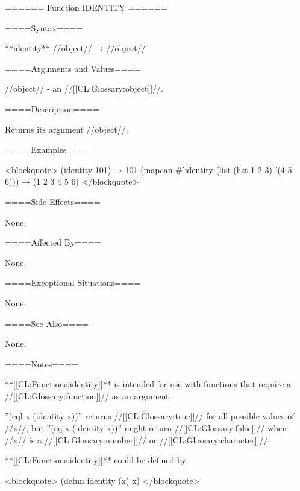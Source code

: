 ====== Function IDENTITY ======

====Syntax====

**identity** //object// → //object//

====Arguments and Values====

//object// - an //[[CL:Glossary:object]]//.

====Description====

Returns its argument //object//.

====Examples====

<blockquote> (identity 101) → 101 (mapcan #'identity (list (list 1 2 3) '(4 5 6))) → (1 2 3 4 5 6) </blockquote>

====Side Effects====

None.

====Affected By====

None.

====Exceptional Situations====

None.

====See Also====

None.

====Notes====

**[[CL:Functions:identity]]** is intended for use with functions that require a //[[CL:Glossary:function]]// as an argument.

''(eql x (identity x))'' returns //[[CL:Glossary:true]]// for all possible values of //x//, but ''(eq x (identity x))'' might return //[[CL:Glossary:false]]// when //x// is a //[[CL:Glossary:number]]// or //[[CL:Glossary:character]]//.

**[[CL:Functions:identity]]** could be defined by

<blockquote> (defun identity (x) x) </blockquote>

